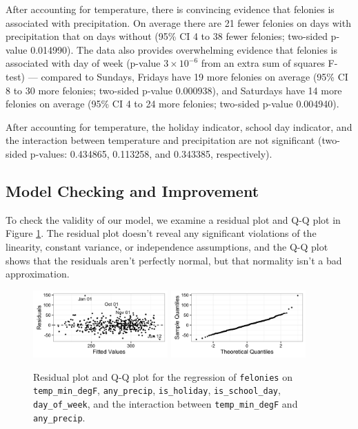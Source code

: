 \documentclass[11pt,notitlepage]{article}
\begin{document}

After accounting for temperature, there is convincing evidence that felonies is associated with precipitation. On average there are 21 fewer felonies on days with precipitation that on days without (95\% CI 4 to 38 fewer felonies; two-sided p-value 0.014990). The data also provides overwhelming evidence that felonies is associated with day of week (p-value $3 \times 10^{-6}$ from an extra sum of squares F-test) --- compared to Sundays, Fridays have 19 more felonies on average (95\% CI 8 to 30 more felonies; two-sided p-value 0.000938), and Saturdays have 14 more felonies on average (95\% CI 4 to 24 more felonies; two-sided p-value 0.004940).

After accounting for temperature, the holiday indicator, school day indicator, and the interaction between temperature and precipitation are not significant (two-sided p-values: 0.434865, 0.113258, and 0.343385, respectively).

\subsection{Model Checking and Improvement}
\label{sec:modelFeloniesModelCheckingImprovement}

To check the validity of our model, we examine a residual plot and Q-Q plot in Figure \ref{fig:lm4ResidualsQQ}. The residual plot doesn't reveal any significant violations of the linearity, constant variance, or independence assumptions, and the Q-Q plot shows that the residuals aren't perfectly normal, but that normality isn't a bad approximation.

\begin{figure}[!h]
  \centering
  \captionsetup{width=0.8\textwidth}
  \subfloat%
  		{\includegraphics[width=0.46\textwidth]
  		{figures/lm4Residuals.png}\label{fig:lm4Residuals}}
  \hfill
  \subfloat%
  		{\includegraphics[width=0.46\textwidth]
  		{figures/lm4QQ.png}\label{fig:lm4QQ}}
  \caption{Residual plot and Q-Q plot for the regression of \texttt{felonies} on \texttt{temp_min_degF}, \texttt{any_precip}, \texttt{is_holiday}, \texttt{is_school_day}, \texttt{day_of_week}, and the interaction between \texttt{temp_min_degF} and \texttt{any_precip}.}
  \label{fig:lm4ResidualsQQ}
\end{figure}
\end{document}
